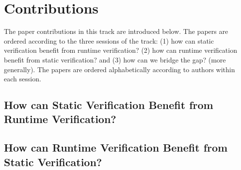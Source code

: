 

\section{Contributions}

 
The paper contributions in this track are introduced below.
The papers are ordered according to the three sessions of the track: 
(1) how can static verification benefit from runtime verification?
(2) how can runtime verification benefit from static verification?
and
(3) how can we bridge the gap? (more generally).
The papers are ordered alphabetically according to authors 
within each session.

 
\subsection{How can Static Verification Benefit from Runtime Verification?} 
 

 





\subsection{How can Runtime Verification Benefit from 
Static Verification?}



